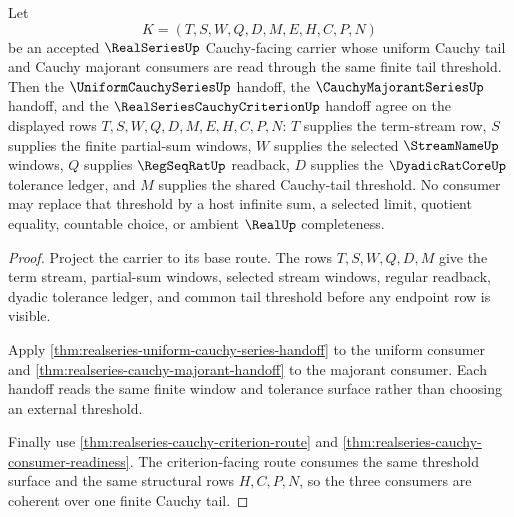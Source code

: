\begin{theorem}
\label{thm:realseries-uniform-majorant-tail-coherence}
Let
$$
K=(T,S,W,Q,D,M,E,H,C,P,N)
$$
be an accepted $\RealSeriesUp$ Cauchy-facing carrier whose uniform Cauchy tail and Cauchy majorant consumers are read through the same finite tail threshold. Then the $\UniformCauchySeriesUp$ handoff, the $\CauchyMajorantSeriesUp$ handoff, and the $\RealSeriesCauchyCriterionUp$ handoff agree on the displayed rows $T,S,W,Q,D,M,E,H,C,P,N$: $T$ supplies the term-stream row, $S$ supplies the finite partial-sum windows, $W$ supplies the selected $\StreamNameUp$ windows, $Q$ supplies $\RegSeqRatUp$ readback, $D$ supplies the $\DyadicRatCoreUp$ tolerance ledger, and $M$ supplies the shared Cauchy-tail threshold. No consumer may replace that threshold by a host infinite sum, a selected limit, quotient equality, countable choice, or ambient $\RealUp$ completeness.
\end{theorem}
\begin{proof}
Project the carrier to its base route. The rows $T,S,W,Q,D,M$ give the term stream, partial-sum windows, selected stream windows, regular readback, dyadic tolerance ledger, and common tail threshold before any endpoint row is visible.

Apply \autoref{thm:realseries-uniform-cauchy-series-handoff} to the uniform consumer and \autoref{thm:realseries-cauchy-majorant-handoff} to the majorant consumer. Each handoff reads the same finite window and tolerance surface rather than choosing an external threshold.

Finally use \autoref{thm:realseries-cauchy-criterion-route} and \autoref{thm:realseries-cauchy-consumer-readiness}. The criterion-facing route consumes the same threshold surface and the same structural rows $H,C,P,N$, so the three consumers are coherent over one finite Cauchy tail.
\end{proof}


